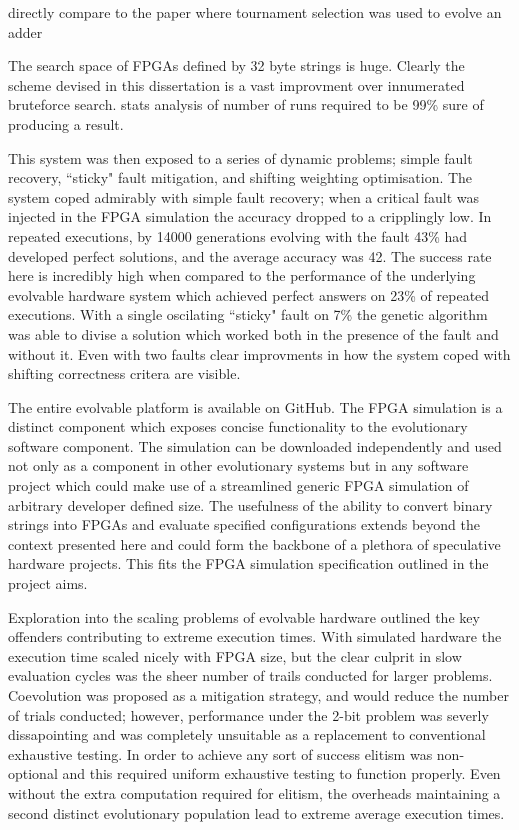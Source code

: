 \todo directly compare to the paper where tournament selection was used to evolve an adder

The search space of FPGAs defined by 32 byte strings is huge. Clearly the
scheme devised in this dissertation is a vast improvment over innumerated bruteforce
search. \todo stats analysis of number of runs required to be 99\% sure of producing a
result.

This system was then exposed to a series of dynamic problems; simple fault
recovery, ``sticky" fault mitigation, and shifting weighting optimisation.
The system coped admirably with simple fault recovery; when a critical fault
was injected in the FPGA simulation the accuracy dropped to a cripplingly low.
In repeated executions, by 14000 generations evolving with the fault 43\%
had developed perfect solutions, and the average accuracy was 42. The success
rate here is incredibly high when compared to the performance of the underlying
evolvable hardware system which achieved perfect answers on 23\% of repeated executions.
With a single oscilating ``sticky" fault on 7\% the genetic algorithm was
able to divise a solution which worked both in the presence of the fault and without
it. Even with two faults clear improvments in how the system coped with shifting
correctness critera are visible.

The entire evolvable platform is available on GitHub. The FPGA simulation
is a distinct component which exposes concise functionality to the evolutionary
software component. The simulation can be downloaded independently and used
not only as a component in other evolutionary systems but in any software project
which could make use of a streamlined generic FPGA simulation of arbitrary developer
defined size. The usefulness of the ability to convert binary strings into FPGAs and evaluate specified
configurations extends beyond the context presented here and could form the backbone
of a plethora of speculative hardware projects. This fits the FPGA simulation
specification outlined in the project aims.

Exploration into the scaling problems of evolvable hardware outlined the key
offenders contributing to extreme execution times. With simulated hardware
the execution time scaled nicely with FPGA size, but the clear culprit in
slow evaluation cycles was the sheer number of trails conducted for larger
problems. Coevolution was proposed as a mitigation strategy, and would reduce
the number of trials conducted; however, performance under the 2-bit problem
was severly dissapointing and was completely unsuitable as a replacement to
conventional exhaustive testing. In order to achieve any sort of success
elitism was non-optional and this required uniform exhaustive testing to function
properly. Even without the extra computation required for elitism, the overheads
maintaining a second distinct evolutionary population lead to extreme average
execution times.

